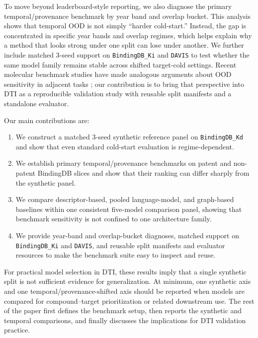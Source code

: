 To move beyond leaderboard-style reporting, we also diagnose the primary temporal/provenance benchmark by year band and overlap bucket. This analysis shows that temporal OOD is not simply ``harder cold-start.'' Instead, the gap is concentrated in specific year bands and overlap regimes, which helps explain why a method that looks strong under one split can lose under another. We further include matched 3-seed support on \texttt{BindingDB\_Ki} and \texttt{DAVIS} to test whether the same model family remains stable across shifted target-cold settings. Recent molecular benchmark studies have made analogous arguments about OOD sensitivity in adjacent tasks \citep{ektefaie2024generalizability,shen2025ddiben,delafuente2025inductive}; our contribution is to bring that perspective into DTI as a reproducible validation study with reusable split manifests and a standalone evaluator.

Our main contributions are:
\begin{enumerate}
    \item We construct a matched 3-seed synthetic reference panel on \texttt{BindingDB\_Kd} and show that even standard cold-start evaluation is regime-dependent.
    \item We establish primary temporal/provenance benchmarks on patent and non-patent BindingDB slices and show that their ranking can differ sharply from the synthetic panel.
    \item We compare descriptor-based, pooled language-model, and graph-based baselines within one consistent five-model comparison panel, showing that benchmark sensitivity is not confined to one architecture family.
    \item We provide year-band and overlap-bucket diagnoses, matched support on \texttt{BindingDB\_Ki} and \texttt{DAVIS}, and reusable split manifests and evaluator resources to make the benchmark suite easy to inspect and reuse.
\end{enumerate}

For practical model selection in DTI, these results imply that a single synthetic split is not sufficient evidence for generalization. At minimum, one synthetic axis and one temporal/provenance-shifted axis should be reported when models are compared for compound--target prioritization or related downstream use. The rest of the paper first defines the benchmark setup, then reports the synthetic and temporal comparisons, and finally discusses the implications for DTI validation practice.
